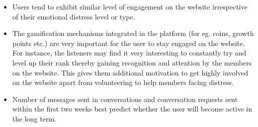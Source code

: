 \begin{itemize}
\item Users tend to exhibit similar level of engagement on the website irrespective of their emotional distress level or type.
\item The gamification mechanisms integrated in the platform (for eg. coins, growth points etc.) are very important for the user to stay engaged on the website. For instance, the listeners may find it very interesting to constantly try and level up their rank thereby gaining recognition and attention by the members on the website. This gives them additional motivation to get highly involved on the website apart from volunteering to help members facing distress.
\item Number of messages sent in conversations and conversation requests sent within the first two weeks best predict whether the user will become active in the long term.
\end{itemize} 